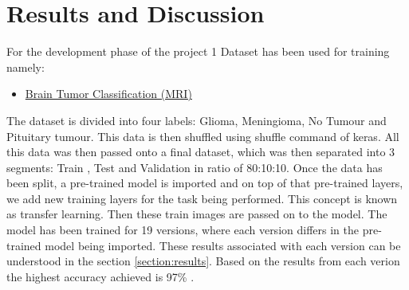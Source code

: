 \chapter{Results and Discussion}
For the development phase of the project 1 Dataset has been used for training namely: 
\begin{itemize}
    \item \href{https://www.kaggle.com/datasets/sartajbhuvaji/brain-tumor-classification-mri}{Brain Tumor Classification (MRI)}
\end{itemize}
The dataset is divided into four labels: Glioma, Meningioma, No Tumour and Pituitary tumour. This data is then shuffled using shuffle command of keras. All this data was then passed onto a final dataset, which was then separated into 3 segments: Train , Test and Validation in ratio of 80:10:10. Once the data has been split, a pre-trained model is imported and on top of that pre-trained layers, we add new training layers for the task being performed. This concept is known as transfer learning. Then these train images are passed on to the model. The model has been trained for 19 versions, where each version differs in the pre-trained model being imported. These results associated with each version can be understood in the section \ref{section:results}. Based on the results from each verion the highest accuracy achieved is 97\% .

